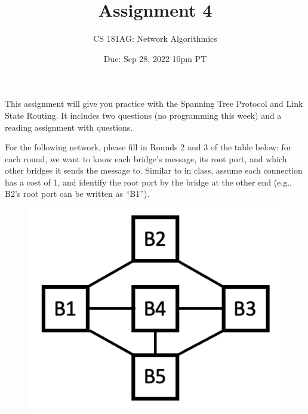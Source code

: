 \documentclass[10pt]{article}
\date{Due: Sep 28, 2022 10pm PT}
\newenvironment{problem}[2][Problem]{\begin{trivlist}
\item[\hskip \labelsep {\bfseries #1}\hskip \labelsep {\bfseries #2.}]}{\end{trivlist}}
\begin{document}
 
\title{Assignment 4}
\author{
CS 181AG: Network Algorithmics}
\maketitle

This assignment will give you practice with the Spanning Tree Protocol and Link State Routing. It includes two questions (no programming this week) and a reading assignment with questions.  

\begin{problem} {1: Spanning Tree Protocol}
For the following network, please fill in Rounds 2 and 3 of the table below: for each round, we want to know each bridge's message, its root port, and which other bridges it sends the message to. Similar to in class, assume each connection has a cost of 1, and identify the root port by the bridge at the other end (e.g., B2's root port can be written as ``B1'').

\begin{figure}[h]
    \centering
    \includegraphics[scale=0.5]{figures/stp.pdf}
    \label{fig:dvp}
\end{figure}


\end{problem}
\end{document}

